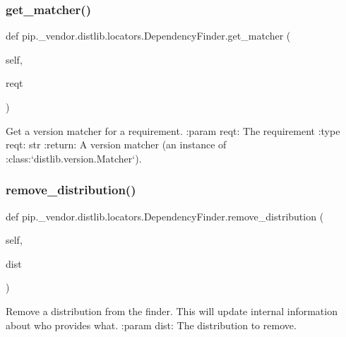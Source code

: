 \subsubsection{\texorpdfstring{get\+\_\+matcher()}{get\_matcher()}}
{\footnotesize\ttfamily def pip.\+\_\+vendor.\+distlib.\+locators.\+Dependency\+Finder.\+get\+\_\+matcher (\begin{DoxyParamCaption}\item[{}]{self,  }\item[{}]{reqt }\end{DoxyParamCaption})}

\begin{DoxyVerb}Get a version matcher for a requirement.
:param reqt: The requirement
:type reqt: str
:return: A version matcher (an instance of
 :class:`distlib.version.Matcher`).
\end{DoxyVerb}
 \mbox{\label{classpip_1_1__vendor_1_1distlib_1_1locators_1_1DependencyFinder_a59c66e9bfaeefec64bd58bb58e5427ec}} 
\subsubsection{\texorpdfstring{remove\+\_\+distribution()}{remove\_distribution()}}
{\footnotesize\ttfamily def pip.\+\_\+vendor.\+distlib.\+locators.\+Dependency\+Finder.\+remove\+\_\+distribution (\begin{DoxyParamCaption}\item[{}]{self,  }\item[{}]{dist }\end{DoxyParamCaption})}

\begin{DoxyVerb}Remove a distribution from the finder. This will update internal
information about who provides what.
:param dist: The distribution to remove.
\end{DoxyVerb}
 \mbox{\label{classpip_1_1__vendor_1_1distlib_1_1locators_1_1DependencyFinder_ae5188bef19f3bfb756cb122d2ffbd6a7}} 
